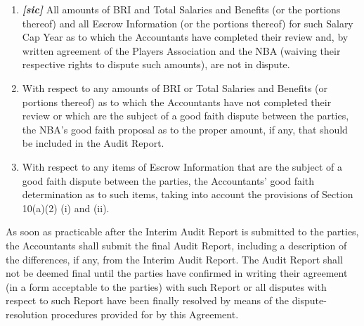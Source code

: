 \documentclass[
]{book}
\providecommand{\tightlist}{%
  \setlength{\itemsep}{0pt}\setlength{\parskip}{0pt}}
\begin{document}
\begin{enumerate}
\begin{enumerate}
    \begin{enumerate}
    \def\labelenumiii{(\roman{enumiii})}
    \setcounter{enumiii}{1}
    \tightlist
    \item
      \textbf{\emph{{[}sic{]}}} All amounts of BRI and Total Salaries and Benefits (or the portions thereof) and all Escrow Information (or the portions thereof) for such Salary Cap Year as to which the Accountants have completed their review and, by written agreement of the Players Association and the NBA (waiving their respective rights to dispute such amounts), are not in dispute.
    \item
      With respect to any amounts of BRI or Total Salaries and Benefits (or portions thereof) as to which the Accountants have not completed their review or which are the subject of a good faith dispute between the parties, the NBA's good faith proposal as to the proper amount, if any, that should be included in the Audit Report.
    \item
      With respect to any items of Escrow Information that are the subject of a good faith dispute between the parties, the Accountants' good faith determination as to such items, taking into account the provisions of Section 10(a)(2) (i) and (ii).
    \end{enumerate}
  \end{enumerate}

  As soon as practicable after the Interim Audit Report is submitted to the parties, the Accountants shall submit the final Audit Report, including a description of the differences, if any, from the Interim Audit Report. The Audit Report shall not be deemed final until the parties have confirmed in writing their agreement (in a form acceptable to the parties) with such Report or all disputes with respect to such Report have been finally resolved by means of the dispute-resolution procedures provided for by this Agreement.


\end{enumerate}
\end{document}
